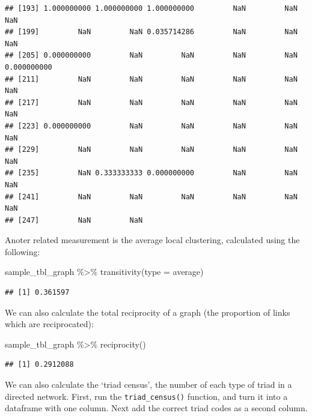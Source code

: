 \documentclass[
]{book}
\newenvironment{Shaded}{\begin{snugshade}}{\end{snugshade}}
\newcommand{\AttributeTok}[1]{\textcolor[rgb]{0.77,0.63,0.00}{#1}}
\newcommand{\FunctionTok}[1]{\textcolor[rgb]{0.00,0.00,0.00}{#1}}
\newcommand{\NormalTok}[1]{#1}
\newcommand{\SpecialCharTok}[1]{\textcolor[rgb]{0.00,0.00,0.00}{#1}}
\newcommand{\StringTok}[1]{\textcolor[rgb]{0.31,0.60,0.02}{#1}}
\begin{document}
\begin{verbatim}
## [193] 1.000000000 1.000000000 1.000000000         NaN         NaN         NaN
## [199]         NaN         NaN 0.035714286         NaN         NaN         NaN
## [205] 0.000000000         NaN         NaN         NaN         NaN 0.000000000
## [211]         NaN         NaN         NaN         NaN         NaN         NaN
## [217]         NaN         NaN         NaN         NaN         NaN         NaN
## [223] 0.000000000         NaN         NaN         NaN         NaN         NaN
## [229]         NaN         NaN         NaN         NaN         NaN         NaN
## [235]         NaN 0.333333333 0.000000000         NaN         NaN         NaN
## [241]         NaN         NaN         NaN         NaN         NaN         NaN
## [247]         NaN         NaN
\end{verbatim}

Anoter related measurement is the average local clustering, calculated using the following:

\begin{Shaded}
\begin{Highlighting}[]
\NormalTok{sample\_tbl\_graph }\SpecialCharTok{\%\textgreater{}\%} \FunctionTok{transitivity}\NormalTok{(}\AttributeTok{type =} \StringTok{\textquotesingle{}average\textquotesingle{}}\NormalTok{) }
\end{Highlighting}
\end{Shaded}

\begin{verbatim}
## [1] 0.361597
\end{verbatim}

We can also calculate the total reciprocity of a graph (the proportion of links which are reciprocated):

\begin{Shaded}
\begin{Highlighting}[]
\NormalTok{sample\_tbl\_graph }\SpecialCharTok{\%\textgreater{}\%} \FunctionTok{reciprocity}\NormalTok{()}
\end{Highlighting}
\end{Shaded}

\begin{verbatim}
## [1] 0.2912088
\end{verbatim}

We can also calculate the `triad census', the number of each type of triad in a directed network. First, run the \texttt{triad\_census()} function, and turn it into a dataframe with one column. Next add the correct triad codes as a second column.
\end{document}
